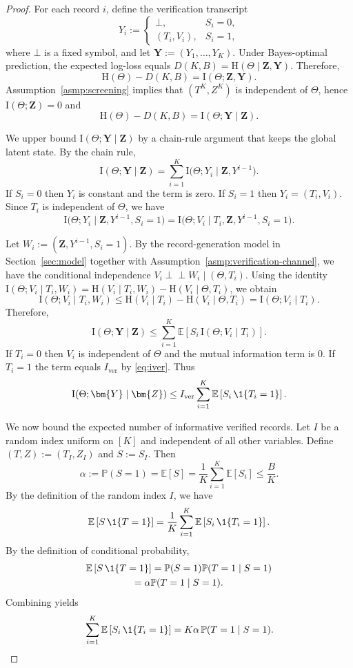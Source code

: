 \documentclass[twocolumn]{scholar7}
\newcommand{\E}{\mathbb{E}}
\newcommand{\Prob}{\mathbb{P}}
\newcommand{\I}{\mathrm{I}}
\newcommand{\Hh}{\mathrm{H}}
\newcommand{\bracks}[1]{\left[#1\right]}
\newcommand{\idx}[1]{\bracks{#1}} %
\begin{document}
\begin{appendix}
\begin{proof}
For each record $i$, define the verification transcript
\[
Y_i:=\begin{cases}
\bot, & S_i=0,\\
(T_i,V_i), & S_i=1,
\end{cases}
\]
where $\bot$ is a fixed symbol, and let $\bm{Y}:=(Y_1,\dots,Y_K)$.
Under Bayes-optimal prediction, the expected log-loss equals
$D(K,B)=\Hh(\Theta\mid \bm{Z},\bm{Y})$.
Therefore,
\[
\Hh(\Theta)-D(K,B)=\I(\Theta;\bm{Z},\bm{Y}).
\]
Assumption~\ref{asmp:screening} implies that $(T^K,Z^K)$ is independent of $\Theta$, hence $\I(\Theta;\bm{Z})=0$ and
\[
\Hh(\Theta)-D(K,B)=\I(\Theta;\bm{Y}\mid \bm{Z}).
\]

We upper bound $\I(\Theta;\bm{Y}\mid \bm{Z})$ by a chain-rule argument that keeps the global latent state.
By the chain rule,
\[
\I(\Theta;\bm{Y}\mid \bm{Z})
=
\sum_{i=1}^K \I\big(\Theta;Y_i\mid \bm{Z},Y^{i-1}\big).
\]
If $S_i=0$ then $Y_i$ is constant and the term is zero.
If $S_i=1$ then $Y_i=(T_i,V_i)$.
Since $T_i$ is independent of $\Theta$, we have
\[
\I\big(\Theta;Y_i\mid \bm{Z},Y^{i-1},S_i=1\big)
=
\I\big(\Theta;V_i\mid T_i,\bm{Z},Y^{i-1},S_i=1\big).
\]

Let $W_i:=(\bm{Z},Y^{i-1},S_i=1)$.
By the record-generation model in Section~\ref{sec:model} together with Assumption~\ref{asmp:verification-channel}, we have the conditional independence
$V_i\perp\!\!\!\perp W_i\mid (\Theta,T_i)$.
Using the identity
$\I(\Theta;V_i\mid T_i,W_i)=\Hh(V_i\mid T_i,W_i)-\Hh(V_i\mid \Theta,T_i)$,
we obtain
\[
\I(\Theta;V_i\mid T_i,W_i)
\le
\Hh(V_i\mid T_i)-\Hh(V_i\mid \Theta,T_i)
=
\I(\Theta;V_i\mid T_i).
\]
Therefore,
\[
\I(\Theta;\bm{Y}\mid \bm{Z})
\le
\sum_{i=1}^K \E\bracks{S_i\,\I(\Theta;V_i\mid T_i)}.
\]
If $T_i=0$ then $V_i$ is independent of $\Theta$ and the mutual information term is $0$.
If $T_i=1$ the term equals $I_{\mathrm{ver}}$ by \eqref{eq:iver}.
Thus
\[
\I(\Theta;\bm{Y}\mid \bm{Z})
\le
I_{\mathrm{ver}}\sum_{i=1}^K \E\bracks{S_i\,\1\{T_i=1\}}.
\]

We now bound the expected number of informative verified records.
Let $I$ be a random index uniform on $\idx{K}$ and independent of all other variables.
Define $(T,Z):=(T_I,Z_I)$ and $S:=S_I$.
Then
\[
\alpha:=\Prob(S=1)=\E[S]=\frac{1}{K}\sum_{i=1}^K \E[S_i]\le \frac{B}{K}.
\]
By the definition of the random index $I$, we have
\[
\E\bracks{S\,\1\{T=1\}}=\frac{1}{K}\sum_{i=1}^K \E\bracks{S_i\,\1\{T_i=1\}}.
\]
By the definition of conditional probability,
\begin{multline*}
\E\bracks{S\,\1\{T=1\}}=\Prob(S=1)\Prob(T=1\mid S=1) \\ 
=\alpha\Prob(T=1\mid S=1).
\end{multline*}
Combining yields
\[
\sum_{i=1}^K \E\bracks{S_i\,\1\{T_i=1\}}=K\alpha\,\Prob(T=1\mid S=1).
\]


\end{proof}
\end{appendix}
\end{document}
